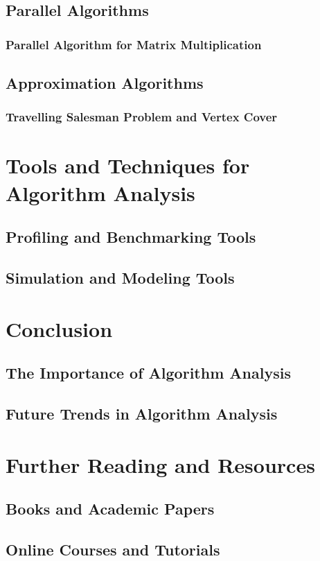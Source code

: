 \documentclass[12pt]{book} %
\begin{document}
\subsection{Parallel Algorithms}
\subsubsection{Parallel Algorithm for Matrix Multiplication}
\subsection{Approximation Algorithms}
\subsubsection{Travelling Salesman Problem and Vertex Cover}

\section{Tools and Techniques for Algorithm Analysis}
\subsection{Profiling and Benchmarking Tools}
\subsection{Simulation and Modeling Tools}

\section{Conclusion}
\subsection{The Importance of Algorithm Analysis}
\subsection{Future Trends in Algorithm Analysis}

\section{Further Reading and Resources}
\subsection{Books and Academic Papers}
\subsection{Online Courses and Tutorials}
\end{document}

